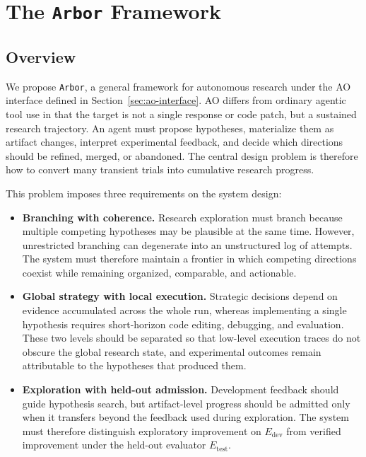 \documentclass[]{selfevolagent}
\theoremstyle{plain}
\theoremstyle{definition}
\theoremstyle{remark}
\newcommand{\arbor}{\texttt{Arbor}}
\begin{document}
\section{The \arbor{} Framework}\label{sec:framework}

\subsection{Overview}\label{sec:framework-overview}

We propose \arbor{}, a general framework for autonomous research under the AO interface defined in Section~\ref{sec:ao-interface}. AO differs from ordinary agentic tool use in that the target is not a single response or code patch, but a sustained research trajectory. An agent must propose hypotheses, materialize them as artifact changes, interpret experimental feedback, and decide which directions should be refined, merged, or abandoned. The central design problem is therefore how to convert many transient trials into cumulative research progress.

This problem imposes three requirements on the system design:

\begin{itemize}[leftmargin=*]

    \item \textbf{Branching with coherence.} Research exploration must branch because multiple competing hypotheses may be plausible at the same time. However, unrestricted branching can degenerate into an unstructured log of attempts. The system must therefore maintain a frontier in which competing directions coexist while remaining organized, comparable, and actionable.

    \item \textbf{Global strategy with local execution.} Strategic decisions depend on evidence accumulated across the whole run, whereas implementing a single hypothesis requires short-horizon code editing, debugging, and evaluation. These two levels should be separated so that low-level execution traces do not obscure the global research state, and experimental outcomes remain attributable to the hypotheses that produced them.

    \item \textbf{Exploration with held-out admission.} Development feedback should guide hypothesis search, but artifact-level progress should be admitted only when it transfers beyond the feedback used during exploration. The system must therefore distinguish exploratory improvement on $E_{\mathrm{dev}}$ from verified improvement under the held-out evaluator $E_{\mathrm{test}}$.

\end{itemize}
\end{document}
